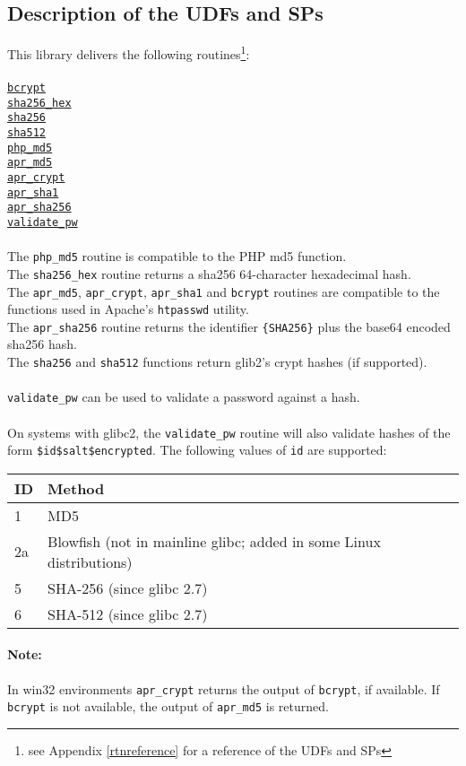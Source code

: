 \subsection{Description of the UDFs and SPs}
This library delivers the following routines\footnote{see Appendix \ref{rtnreference} for a reference of the UDFs and SPs}:\\
\\
\hyperlink{hbcrypt}{\tt bcrypt}\\
\hyperlink{hsha256hex}{\tt sha256\_hex}\\
\hyperlink{hsha256}{\tt sha256}\\
\hyperlink{hsha512}{\tt sha512}\\
\hyperlink{hphpmd5}{\tt php\_md5}\\
\hyperlink{haprmd5}{\tt apr\_md5}\\
\hyperlink{haprcrypt}{\tt apr\_crypt}\\
\hyperlink{haprsha1}{\tt apr\_sha1}\\
\hyperlink{haprsha256}{\tt apr\_sha256}\\
\hyperlink{hvalidatepw}{\tt validate\_pw}\\
\\
The {\tt php\_md5} routine is compatible to the PHP md5 function.\\
The {\tt sha256\_hex} routine returns a sha256 64-character hexadecimal hash.\\
The {\tt apr\_md5}, {\tt apr\_crypt}, {\tt apr\_sha1} and {\tt bcrypt} routines are compatible to the functions used in Apache's {\tt htpasswd} utility.\\
The {\tt apr\_sha256} routine returns the identifier {\tt \{SHA256\}} plus the base64 encoded sha256 hash.\\
The {\tt sha256} and {\tt sha512} functions return glib2's crypt hashes (if supported).\\
\\
{\tt validate\_pw} can be used to validate a password against a hash.\\
\\
On systems with glibc2, the {\tt validate\_pw} routine will also validate hashes of the form \mbox{\tt \$id\$salt\$encrypted}. The following values of {\tt id} are supported:\\

\begin{tabular}{l|l}
 ID  &  Method                                                              \\ \hline
1    &  MD5                                                                 \\
2a   &  Blowfish (not in mainline glibc; added in some Linux distributions) \\
5    &  SHA-256 (since glibc 2.7)                                           \\
6    &  SHA-512 (since glibc 2.7)                                           \\
\end{tabular}

\paragraph{Note:}{In win32 environments {\tt apr\_crypt} returns the output of {\tt bcrypt}, if available. If {\tt bcrypt} is not available, the output of {\tt apr\_md5} is returned.}
